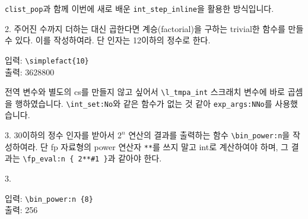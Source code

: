 \documentclass[a4paper,amsmath]{oblivoir}
\begin{document}
\verb|clist_pop|과 함께 이번에 새로 배운 \verb|int_step_inline|을 활용한
방식입니다.


\pagebreak
\begin{questionp}
   2. 주어진 수까지 더하는 대신 곱한다면 계승(factorial)을 구하는 trivial한 함수를 만들 수 있다. 이를 작성하여라. 단 인자는 12이하의 정수로 한다. 

  \tcblower

  \begin{minipage}[t]{10cm}
    입력: \verb|\simplefact{10}| \\
    출력: 3628800
  \end{minipage}
\end{questionp}

전역 변수와 별도의 cs를 만들지 않고 싶어서 \verb|\l_tmpa_int| 스크래치
변수에 바로 곱셈을 행하였습니다.
\verb|\int_set:No|와 같은 함수가 없는 것 같아 \verb|exp_args:NNo|를
사용했습니다.

\pagebreak
\begin{questionp}
   3. 30이하의 정수 인자를 받아서 $2^n$ 연산의 결과를 출력하는 함수 \verb|\bin_power:n|을 작성하여라. 단 \textsf{fp} 자료형의 power 연산자 \verb|**|를 쓰지 말고 \textsf{int}로 계산하여야 하며, 그 결과는 \verb|\fp_eval:n { 2**#1 }|과 같아야 한다.

  \tcblower

  3. \begin{minipage}[t]{10cm}
    입력: \verb|\bin_power:n {8}| \\
    출력: 256
  \end{minipage}
\end{questionp}
\end{document}

